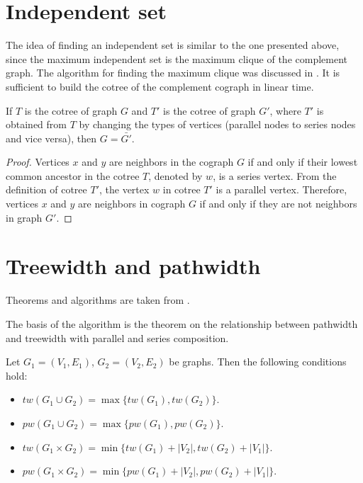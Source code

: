 \section{Independent set}

The idea of finding an independent set is similar to the one presented above, since the maximum independent set is the maximum clique of the complement graph. The algorithm for finding the maximum clique was discussed in . It is sufficient to build the cotree of the complement cograph in linear time.
\begin{theorem}
If $T$ is the cotree of graph $G$ and $T'$ is the cotree of graph $G'$, where 
$T'$ is obtained from $T$ by changing the types of vertices (parallel nodes to series nodes and vice versa), then $G=\bar{G'}$.
\end{theorem}

\begin{proof}
Vertices $x$ and $y$ are neighbors in the cograph $G$ if and only if their lowest common ancestor in the cotree $T$, denoted by $w$, is a series vertex. From the definition of cotree $T'$, the vertex $w$ in cotree $T'$ is a parallel vertex. Therefore, vertices $x$ and $y$ are neighbors in cograph $G$ if and only if they are not neighbors in graph $G'$.
\end{proof}

\section{Treewidth and pathwidth}
Theorems and algorithms are taken from \cite{Sumner1974DaceyG}.

The basis of the algorithm is the theorem on the relationship between pathwidth and treewidth with parallel and series composition.
\begin{theorem} 
    Let $G_1=(V_1,E_1)$, $G_2=(V_2,E_2)$ be graphs. Then the following conditions hold:
    \begin{itemize}
        \item $tw(G_1\cup G_2)= \max\{tw(G_1), tw(G_2)\}$.
        \item $pw(G_1\cup G_2)= \max\{pw(G_1), pw(G_2)\}$.
        \item $tw(G_1\times G_2)= \min\{tw(G_1) + |V_2|, tw(G_2) + |V_1|\}$.
        \item $pw(G_1\times G_2)= \min\{pw(G_1) + |V_2|, pw(G_2) + |V_1|\}$.
    \end{itemize}
    \label{Theorem on treewidth in a binary cotree}
\end{theorem}

